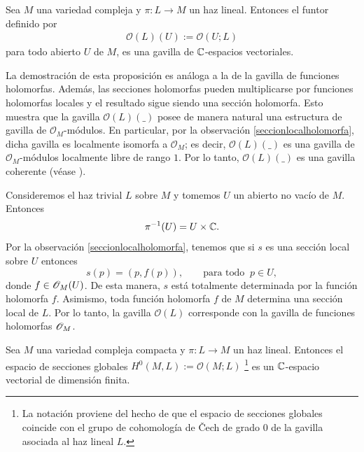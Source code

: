 	\begin{propo}
		Sea $M$ una variedad compleja y $\pi:L\to M$ un haz lineal. Entonces el funtor definido por
		\begin{align*}
			\mathcal{O}(L)(U):=\mathcal{O}(U;L)
		\end{align*}
		para todo abierto $U$ de $M$, es una gavilla de $\mathbb{C}$-espacios vectoriales.
	\end{propo}
	
	La demostración de esta proposición es análoga a la de la gavilla de funciones holomorfas. Además, las secciones holomorfas pueden multiplicarse por funciones holomorfas locales y el resultado sigue siendo una sección holomorfa. Esto muestra que la gavilla $\mathcal{O}(L)(\_)$ posee de manera natural una estructura de gavilla de $\mathcal{O}_M$-módulos. En particular, por la observación \ref{seccionlocalholomorfa}, dicha gavilla es localmente isomorfa a $\mathcal{O}_M$; es decir, $\mathcal{O}(L)(\_)$ es una gavilla de $\mathcal{O}_M$-módulos localmente libre de rango $1$. Por lo tanto, $\mathcal{O}(L)(\_)$ es una gavilla coherente (véase \parencite[Chap.~5, Sec.~3.4]{griffiths}).

	\begin{example}\label{seccionesdeltrivial}
		Consideremos el haz trivial $L$ sobre $M$ y tomemos $U$ un abierto no vacío de $M$. Entonces
		\begin{equation*}
			\pi^{-1}(U)= U\times \mathbb{C}.
		\end{equation*}
		Por la observación \ref{seccionlocalholomorfa}, tenemos que si $s$ es una sección local sobre $U$ entonces
		\begin{equation*}
			s(p)=(p,f(p)),\qquad \text{para todo }\ p\in U,
		\end{equation*}
		donde $f\in\mathscr{O}_M(U)$. De esta manera, $s$ está totalmente determinada por la función holomorfa $f$. Asimismo, toda función holomorfa $f$ de $M$ determina una sección local de $L$. Por lo tanto, la gavilla $\mathcal{O}(L)$ corresponde con la gavilla de funciones holomorfas $\mathscr{O}_M$.
	\end{example}
	
	\begin{theorem}
		Sea $M$ una variedad compleja compacta y $\pi:L\to M$ un haz lineal. Entonces el espacio de secciones globales $	H^0(M,L):=\mathcal{O}(M;L)$ \footnote{La notación proviene del hecho de que el espacio de secciones globales coincide con el grupo de cohomología de Čech de grado $0$ de la gavilla asociada al haz lineal $L$.} es un $\mathbb{C}$-espacio vectorial de dimensión finita.
	\end{theorem}
	
